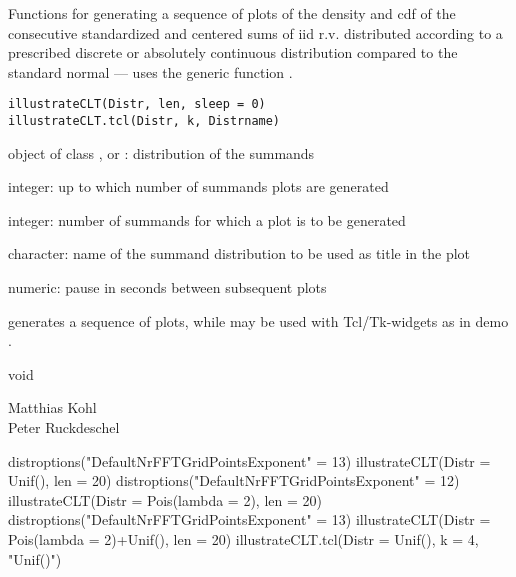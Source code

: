 \documentclass{article}
\begin{document}
\begin{Description}\relax
Functions for generating a sequence of plots of
the density and cdf of the consecutive standardized and centered sums of iid 
r.v. distributed according to a prescribed discrete or absolutely continuous 
distribution compared to the standard normal --- uses the generic function 
.
\end{Description}
\begin{Usage}
\begin{verbatim}illustrateCLT(Distr, len, sleep = 0)
illustrateCLT.tcl(Distr, k, Distrname)
\end{verbatim}
\end{Usage}
\begin{Arguments}
\begin{ldescription}
\item[\code{Distr}] object of class , 
 or : distribution of 
the summands
\item[\code{len}] integer: up to which number of summands plots are generated
\item[\code{k}] integer: number of summands for which a plot is to be generated
\item[\code{Distrname}] character: name of the summand distribution to be used as 
title in the plot
\item[\code{sleep}] numeric: pause in seconds between subsequent plots 
\end{ldescription}
\end{Arguments}
\begin{Details}\relax
{} generates a sequence of plots, while 
 may be used with Tcl/Tk-widgets as in demo 
.
\end{Details}
\begin{Value}
void
\end{Value}
\begin{Author}\relax
Matthias Kohl \\
Peter Ruckdeschel 
\end{Author}
\begin{SeeAlso}\relax
{}
\end{SeeAlso}
\begin{Examples}
\begin{ExampleCode}
distroptions("DefaultNrFFTGridPointsExponent" = 13)
illustrateCLT(Distr = Unif(), len = 20)
distroptions("DefaultNrFFTGridPointsExponent" = 12)
illustrateCLT(Distr = Pois(lambda = 2), len = 20)
distroptions("DefaultNrFFTGridPointsExponent" = 13)
illustrateCLT(Distr = Pois(lambda = 2)+Unif(), len = 20)
illustrateCLT.tcl(Distr = Unif(), k = 4, "Unif()")
\end{ExampleCode}
\end{Examples}
\end{document}
